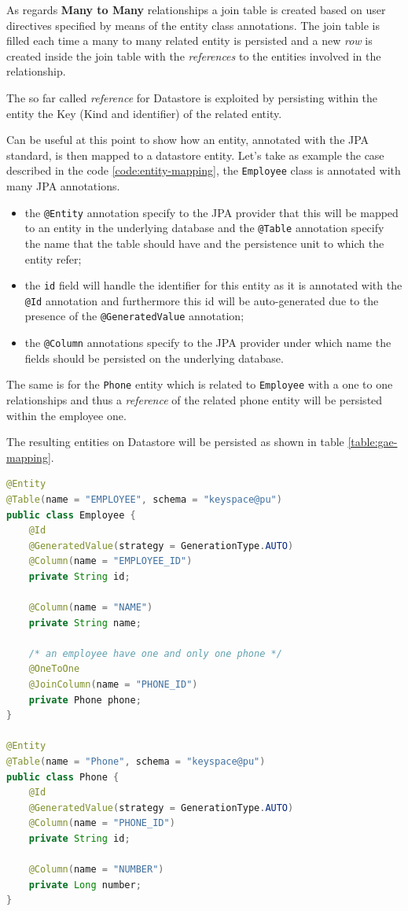 \noindent As regards \textbf{Many to Many} relationships a join table is created based on user directives specified by means of the entity class annotations. The join table is filled each time a many to many related entity is persisted and a new \textit{row} is created inside the join table with the \textit{references} to the entities involved in the relationship.

\noindent The so far called \textit{reference} for Datastore is exploited by persisting within the entity the Key (Kind and identifier) of the related entity.

\newparagraph Can be useful at this point to show how an entity, annotated with the JPA standard, is then mapped to a datastore entity. 
Let's take as example the case described in the code \ref{code:entity-mapping}, the \texttt{Employee} class is annotated with many JPA annotations.
\begin{itemize}
\item the \texttt{@Entity} annotation specify to the JPA provider that this will be mapped to an entity in the underlying database and the \texttt{@Table} annotation specify the name that the table should have and the persistence unit to which the entity refer;
\item the \texttt{id} field will handle the identifier for this entity as it is annotated with the \texttt{@Id} annotation and furthermore this id will be auto-generated due to the presence of the \texttt{@GeneratedValue} annotation;
\item the \texttt{@Column} annotations specify to the JPA provider under which name the fields should be persisted on the underlying database.
\end{itemize}
The same is for the \texttt{Phone} entity which is related to \texttt{Employee} with a one to one relationships and thus a \textit{reference} of the related phone entity will be persisted within the employee one.

\noindent The resulting entities on Datastore will be persisted as shown in table \ref{table:gae-mapping}.

\begin{lstlisting}[language=Java, caption=Example entities, label=code:entity-mapping]
@Entity
@Table(name = "EMPLOYEE", schema = "keyspace@pu")
public class Employee {
    @Id
    @GeneratedValue(strategy = GenerationType.AUTO)
    @Column(name = "EMPLOYEE_ID")
    private String id;

    @Column(name = "NAME")
    private String name;

    /* an employee have one and only one phone */
    @OneToOne
    @JoinColumn(name = "PHONE_ID")
    private Phone phone;
}

@Entity
@Table(name = "Phone", schema = "keyspace@pu")
public class Phone {
    @Id
    @GeneratedValue(strategy = GenerationType.AUTO)
    @Column(name = "PHONE_ID")
    private String id;

    @Column(name = "NUMBER")
    private Long number;
}
\end{lstlisting}

